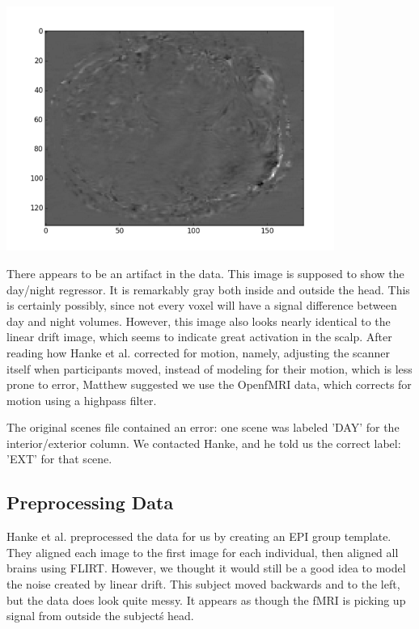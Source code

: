 \begin{center}                                                                  
\includegraphics[height=8cm]{1}                                                 
\end{center}    
There appears to be an artifact in the data.  This image is supposed to show 
the day/night regressor. It is remarkably gray both inside and outside the 
head.  This is certainly possibly, since not every voxel will have a signal
difference between day and night volumes.  However, this image also looks 
nearly identical to the linear drift image, which seems to indicate great
activation in the scalp.  After reading how Hanke et al. corrected for motion,
namely, adjusting the scanner itself when participants moved, instead of 
modeling for their motion, which is less prone to error, Matthew suggested we
use the OpenfMRI data, which corrects for motion using a highpass filter.

The original scenes file contained an error: one scene was labeled 'DAY' for 
the interior/exterior column.  We contacted Hanke, and he told us the correct 
label: 'EXT' for that scene.     
   
\subsection{Preprocessing Data}                      

Hanke et al. preprocessed the data for us by creating an EPI group template.    
They aligned each image to the first image for each individual, then aligned    
all brains using FLIRT.  However, we thought it would still be a good idea to   
model the noise created by linear drift.  This subject moved backwards and to   
the left, but the data does look quite messy.  It appears as though the fMRI    
is picking up signal from outside the subject\'s head.

